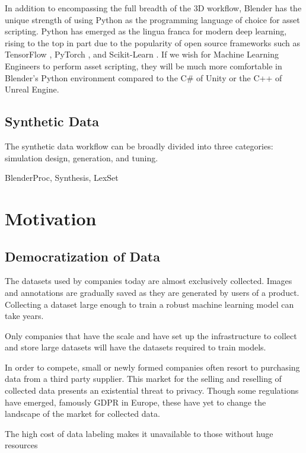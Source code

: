 \documentclass{article}
\begin{document}
In addition to encompassing the full breadth of the 3D workflow, Blender has the unique strength of using Python as the programming language of choice for asset scripting. Python has emerged as the lingua franca for modern deep learning, rising to the top in part due to the popularity of open source frameworks such as TensorFlow \citep{tensorflow}, PyTorch \citep{pytorch}, and Scikit-Learn \citep{scikit-learn}. If we wish for Machine Learning Engineers to perform asset scripting, they will be much more comfortable in Blender’s Python environment compared to the C# of Unity or the C++ of Unreal Engine.


\subsection{Synthetic Data}
\label{sec:syntheticdata}

The synthetic data workflow can be broadly divided into three categories: simulation design, generation, and tuning.

BlenderProc, Synthesis, LexSet

\section{Motivation}
\label{sec:motivation}

\subsection{Democratization of Data}

The datasets used by companies today are almost exclusively collected. Images and annotations are gradually saved as they are generated by users of a product. Collecting a dataset large enough to train a robust machine learning model can take years.

Only companies that have the scale and have set up the infrastructure to collect and store large datasets will have the datasets required to train models.

In order to compete, small or newly formed companies often resort to purchasing data from a third party supplier. This market for the selling and reselling of collected data presents an existential threat to privacy. Though some regulations have emerged, famously GDPR in Europe, these have yet to change the landscape of the market for collected data.

The high cost of data labeling makes it unavailable to those without huge resources
\end{document}
